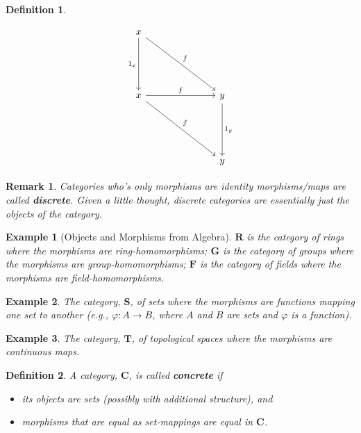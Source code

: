 \documentclass[12pt,reqno]{amsart}
\theoremstyle{plain}
\newtheorem{defi}{Definition}
\newtheorem{rem}{Remark}
\newtheorem{ex}{Example}
\newcommand{\cat}{\mathbf{C}}
\newcommand{\ca}{\mathbf}
\begin{document}
\begin{defi}
\begin{itemize}
\[
\begin{tikzcd}
x \arrow[ddd, "1_x"'] \arrow[rrrddd, "f"] &  &  &                    \\
                                        &  &  &                    \\
                                        &  &  &                    \\
x \arrow[rrrddd, "f"] \arrow[rrr, "f"]  &  &  & y \arrow[ddd, "1_y"] \\
                                        &  &  &                    \\
                                        &  &  &                    \\
                                        &  &  & y                 
\end{tikzcd}
\]
\end{itemize}
\end{defi} 
\begin{rem} Categories who's only morphisms are identity morphisms/maps are called \textbf{discrete}. Given a little thought, discrete categories are essentially just the objects of the category. 
\end{rem} 
\begin{ex}[Objects and Morphisms from Algebra] $\ca {R}$ is the category of rings where the morphisms are ring-homomorphisms; $\ca {G}$ is the category of groups where the morphisms are group-homomorphisms; $\ca {F}$ is the category of fields where the morphisms are field-homomorphisms. 
\end{ex} 
\begin{ex} The category, $\ca {S}$, of sets where the morphisms are functions mapping one set to another (e.g., $\varphi \colon A \to B$, where $A$ and $B$ are sets and $\varphi$ is a function).
\end{ex}
\begin{ex} The category, $\ca{T}$, of topological spaces where the morphisms are continuous maps. 
\end{ex} 
\begin{defi} A category, $\cat$, is called \textbf{concrete} if 
\begin{itemize}
\item[\textup{(i)}] its objects are sets (possibly with additional structure), and
\item[\textup{(ii)}] morphisms that are equal as set-mappings are equal in $\cat$. 
\end{itemize}
\end{defi} 
\end{document}
